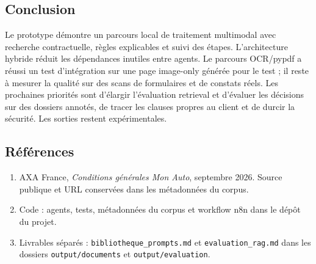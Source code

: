 \documentclass[10pt,a4paper]{article}
\newcommand{\code}[1]{\texttt{\small #1}}
\begin{document}
\subsection*{Conclusion}
Le prototype démontre un parcours local de traitement multimodal avec recherche contractuelle, règles explicables et suivi des étapes. L’architecture hybride réduit les dépendances inutiles entre agents. Le parcours OCR/pypdf a réussi un test d’intégration sur une page image-only générée pour le test ; il reste à mesurer la qualité sur des scans de formulaires et de constats réels. Les prochaines priorités sont d’élargir l’évaluation retrieval et d’évaluer les décisions sur des dossiers annotés, de tracer les clauses propres au client et de durcir la sécurité. Les sorties restent expérimentales.

\subsection*{Références}
\begin{enumerate}
\item AXA France, \emph{Conditions générales Mon Auto}, septembre 2026. Source publique et URL conservées dans les métadonnées du corpus.
\item Code : agents, tests, métadonnées du corpus et workflow n8n dans le dépôt du projet.
\item Livrables séparés : \code{bibliotheque\_prompts.md} et \code{evaluation\_rag.md} dans les dossiers \code{output/documents} et \code{output/evaluation}.
\end{enumerate}

\clearpage
\end{document}
